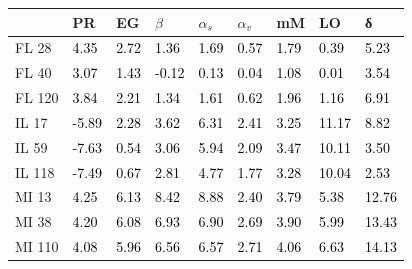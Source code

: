 \begin{tabular}{lllllllll}
\toprule
 & PR & EG & $β$ & $α_s$ & $α_v$ & mM & LO & δ \\
\midrule
FL 28 & \textcolor{black}{ 4.35 } & \textcolor{black}{ 2.72 } & \textcolor{black}{ 1.36 } & \textcolor{black}{ 1.69 } & \textcolor{black}{ 0.57 } & \textcolor{black}{ 1.79 } & \textcolor{black}{ 0.39 } & \textcolor{black}{ 5.23 } \\
FL 40 & \textcolor{black}{ 3.07 } & \textcolor{black}{ 1.43 } & \textcolor{black}{ -0.12 } & \textcolor{black}{ 0.13 } & \textcolor{black}{ 0.04 } & \textcolor{black}{ 1.08 } & \textcolor{black}{ 0.01 } & \textcolor{black}{ 3.54 } \\
FL 120 & \textcolor{black}{ 3.84 } & \textcolor{black}{ 2.21 } & \textcolor{black}{ 1.34 } & \textcolor{black}{ 1.61 } & \textcolor{black}{ 0.62 } & \textcolor{black}{ 1.96 } & \textcolor{black}{ 1.16 } & \textcolor{black}{ 6.91 } \\
IL 17 & \textcolor{black}{ -5.89 } & \textcolor{black}{ 2.28 } & \textcolor{black}{ 3.62 } & \textcolor{black}{ 6.31 } & \textcolor{black}{ 2.41 } & \textcolor{black}{ 3.25 } & \textcolor{black}{ 11.17 } & \textcolor{black}{ 8.82 } \\
IL 59 & \textcolor{black}{ -7.63 } & \textcolor{black}{ 0.54 } & \textcolor{black}{ 3.06 } & \textcolor{black}{ 5.94 } & \textcolor{black}{ 2.09 } & \textcolor{black}{ 3.47 } & \textcolor{black}{ 10.11 } & \textcolor{black}{ 3.50 } \\
IL 118 & \textcolor{black}{ -7.49 } & \textcolor{black}{ 0.67 } & \textcolor{black}{ 2.81 } & \textcolor{black}{ 4.77 } & \textcolor{black}{ 1.77 } & \textcolor{black}{ 3.28 } & \textcolor{black}{ 10.04 } & \textcolor{black}{ 2.53 } \\
MI 13 & \textcolor{black}{ 4.25 } & \textcolor{black}{ 6.13 } & \textcolor{black}{ 8.42 } & \textcolor{black}{ 8.88 } & \textcolor{black}{ 2.40 } & \textcolor{black}{ 3.79 } & \textcolor{black}{ 5.38 } & \textcolor{black}{ 12.76 } \\
MI 38 & \textcolor{black}{ 4.20 } & \textcolor{black}{ 6.08 } & \textcolor{black}{ 6.93 } & \textcolor{black}{ 6.90 } & \textcolor{black}{ 2.69 } & \textcolor{black}{ 3.90 } & \textcolor{black}{ 5.99 } & \textcolor{black}{ 13.43 } \\
MI 110 & \textcolor{black}{ 4.08 } & \textcolor{black}{ 5.96 } & \textcolor{black}{ 6.56 } & \textcolor{black}{ 6.57 } & \textcolor{black}{ 2.71 } & \textcolor{black}{ 4.06 } & \textcolor{black}{ 6.63 } & \textcolor{black}{ 14.13 } \\

\end{tabular}
